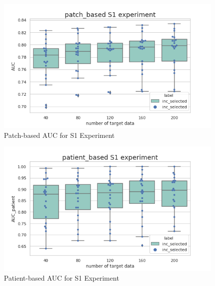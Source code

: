 \begin{figure}[H]
    \hfil
    \begin{minipage}[t]{0.9\textwidth}
        \includegraphics[width=\textwidth]{fig/S1_num_patch.png}
        \caption{\label{fig:parallel1}Patch-based AUC for S1 Experiment}
    \end{minipage}
    \hfil
\end{figure}
\begin{figure}[H]
    \hfil
    \begin{minipage}[t]{0.9\textwidth}
        \includegraphics[width=\textwidth]{fig/S1_num_patient.png}
        \caption{\label{fig:parallel1}Patient-based AUC for S1 Experiment}
    \end{minipage}
    \hfil
\end{figure}
~\\
